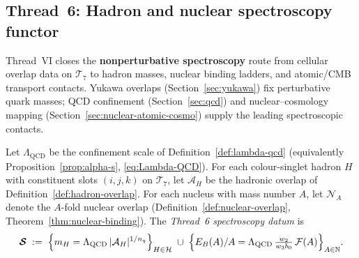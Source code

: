\subsection{Thread~6: Hadron and nuclear spectroscopy functor}
\label{sec:thread-6}

Thread~VI closes the \textbf{nonperturbative spectroscopy} route from
cellular overlap data on $\mathcal{T}_7$ to hadron masses, nuclear binding
ladders, and atomic/CMB transport contacts. Yukawa overlaps
(Section~\ref{sec:yukawa}) fix perturbative quark masses; QCD confinement
(Section~\ref{sec:qcd}) and nuclear--cosmology mapping
(Section~\ref{sec:nuclear-atomic-cosmo}) supply the leading spectroscopic
contacts.

\begin{definition}
\label{def:thread6-spec}
Let $\Lambda_{\mathrm{QCD}}$ be the confinement scale of
Definition~\ref{def:lambda-qcd} (equivalently Proposition~\ref{prop:alpha-s},
\eqref{eq:Lambda-QCD}). For each colour-singlet hadron $H$ with constituent
slots $(i,j,k)$ on $\mathcal{T}_7$, let $\mathcal{A}_H$ be the hadronic
overlap of Definition~\ref{def:hadron-overlap}. For each nucleus with mass
number $A$, let $\mathcal{N}_A$ denote the $A$-fold nuclear overlap
(Definition~\ref{def:nuclear-overlap}, Theorem~\ref{thm:nuclear-binding}).
The \emph{Thread~6 spectroscopy datum} is
\begin{equation}\label{eq:thread6-datum}
  \boldsymbol{\mathcal{S}}
  \;:=\;
  \Bigl\{
    m_H=\Lambda_{\mathrm{QCD}}\,|\mathcal{A}_H|^{1/n_q}
  \Bigr\}_{H\in\mathcal{H}}
  \;\cup\;
  \Bigl\{
    E_B(A)/A=\Lambda_{\mathrm{QCD}}\,\tfrac{w_2}{w_3 b_0}\,\mathcal{F}(A)
  \Bigr\}_{A\in\mathbb{N}}.
\end{equation}
\end{definition}

